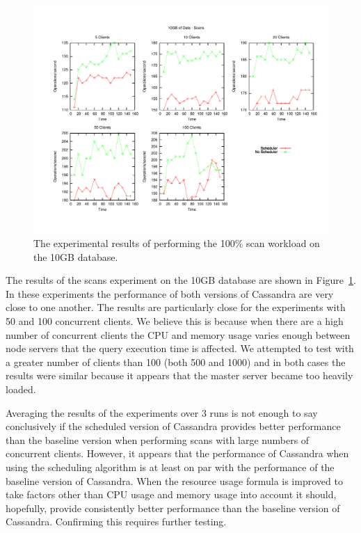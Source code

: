 \begin{figure}[t]
\centering
\includegraphics[scale=0.5]{images/10GB_Scans.pdf}
\vspace{-15pt}
\caption{The experimental results of performing the 100\% scan workload on the 10GB database.}
\label{fig:10g_scans}
\end{figure}

The results of the scans experiment on the 10GB database are shown in Figure~\ref{fig:10g_scans}. In these experiments the performance of both versions of Cassandra are very close to one another. The results are particularly close for the experiments with 50 and 100 concurrent clients. We believe this is because when there are a high number of concurrent clients the CPU and memory usage varies enough between node servers that the query execution time is affected. We attempted to test with a greater number of clients than 100 (both 500 and 1000) and in both cases the results were similar because it appears that the master server became too heavily loaded.

Averaging the results of the experiments over 3 runs is not enough to say conclusively if the scheduled version of Cassandra provides better performance than the baseline version when performing scans with large numbers of concurrent clients. However, it appears that the performance of Cassandra when using the scheduling algorithm is at least on par with the performance of the baseline version of Cassandra. When the resource usage formula is improved to take factors other than CPU usage and memory usage into account it should, hopefully, provide consistently better performance than the baseline version of Cassandra. Confirming this requires further testing.

